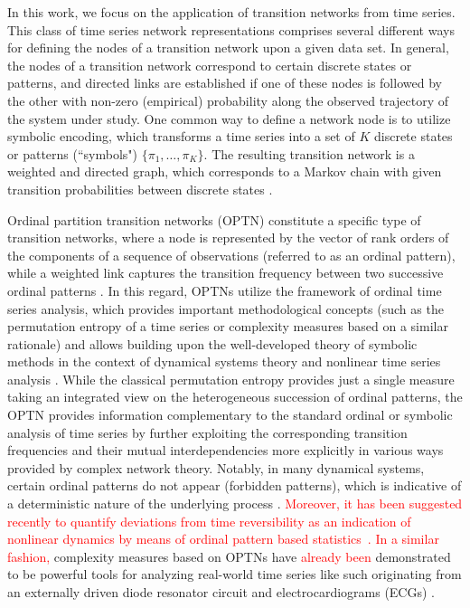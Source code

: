 \documentclass[12pt,aip,cha,reprint,nofootinbib]{revtex4-1}
\begin{document}
In this work, we focus on the application of transition networks from time series. This class of time series network representations comprises several different ways for defining the nodes of a transition network upon a given data set. In general, the nodes of a transition network correspond to certain discrete states or patterns, and directed links are established if one of these nodes is followed by the other with non-zero (empirical) probability along the observed trajectory of the system under study. One common way to define a network node is to utilize  symbolic encoding, which transforms a time series into a set of $K$ discrete states or patterns (``symbols") $\{\pi_1, \dots , \pi_K \}$. The resulting transition network is a weighted and directed graph, which corresponds to a Markov chain with given transition probabilities between discrete states \cite{Schnakenberg1976}.

Ordinal partition transition networks (OPTN) constitute a specific type of transition networks, where a node is represented by the vector of rank orders of the components of a sequence of observations (referred to as an ordinal pattern), while a weighted link captures the transition frequency between two successive ordinal patterns \cite{McCullough2015,KulpChaos2016,KulpChaos2016b,McCulloughChaos2016,SakellariouChaos2016}. In this regard, OPTNs utilize the framework of ordinal time series analysis, which provides important methodological concepts (such as the permutation entropy of a time series \cite{Bandt2002} or complexity measures based on a similar rationale) and allows building upon the well-developed theory of symbolic methods in the context of dynamical systems theory and nonlinear time series analysis \cite{Daw2003,Finn2003,Amigo2010}. While the classical permutation entropy provides just a single measure taking an integrated view on the heterogeneous succession of ordinal patterns, the OPTN \cite{McCullough2015,KulpChaos2016,McCullough2017b} provides information complementary to the standard ordinal or symbolic analysis of time series by further exploiting the corresponding transition frequencies and their mutual interdependencies more explicitly in various ways provided by complex network theory. Notably, in many dynamical systems, certain ordinal patterns do not appear (forbidden patterns), which is indicative of a deterministic nature of the underlying process \cite{KulpChaos2016b,McCulloughChaos2016,SakellariouChaos2016}. \textcolor{red}{Moreover, it has been suggested recently to quantify deviations from time reversibility as an indication of nonlinear dynamics by means of ordinal pattern based statistics~\cite{Martinez2018}. In a similar fashion,} complexity measures based on OPTNs have \textcolor{red}{already been} demonstrated to be powerful tools for analyzing real-world time series like such originating from an externally driven diode resonator circuit \cite{McCullough2015} and electrocardiograms (ECGs) \cite{McCullough2017b}.
\end{document}
